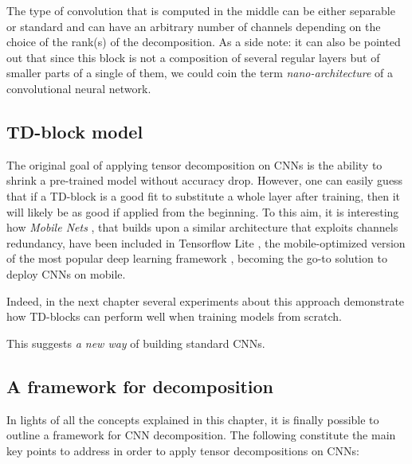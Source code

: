 \pagebreak
The type of convolution that is computed in the middle can be either separable or standard and can have an arbitrary number of channels depending on the choice of the rank(s) of the decomposition. 
\newline 
As a side note: it can also be pointed out that since this block is not a composition of several regular layers but of smaller parts of a single of them, we could coin the term \emph{nano-architecture} of a convolutional neural network. 

\subsection{TD-block model}
The original goal of applying tensor decomposition on CNNs is the ability to shrink a pre-trained model without accuracy drop. However, one can easily guess that if a TD-block is a good fit to substitute a whole layer after training, then it will likely be as good if applied from the beginning. 
\newline
To this aim, it is interesting how \emph{Mobile Nets} \parencite{mobilenets}, that builds upon a similar architecture that exploits channels redundancy, have been included in Tensorflow Lite \parencite{WTFlite}, the mobile-optimized version of the most popular deep learning framework \parencite{tensorflow}, becoming the go-to solution to deploy CNNs on mobile. 

Indeed, in the next chapter several experiments about this approach demonstrate how TD-blocks can perform well when training models from scratch. 
\newline 

This suggests \emph{a new way} of building standard CNNs.  


\subsection{A framework for decomposition}
\label{subsec:framework}
In lights of all the concepts explained in this chapter, it is finally possible to outline a framework for CNN decomposition. The following constitute the main key points to address in order to apply tensor decompositions on CNNs: 


